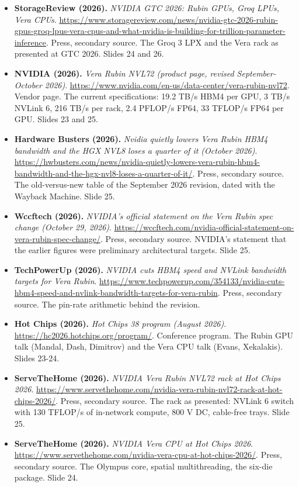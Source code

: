 \documentclass[11pt,letterpaper]{article}
\begin{document}
\begin{itemize}[leftmargin=1.2em,itemsep=3pt]
\item \textbf{StorageReview (2026).} \textit{NVIDIA GTC 2026: Rubin GPUs, Groq LPUs, Vera CPUs}. \url{https://www.storagereview.com/news/nvidia-gtc-2026-rubin-gpus-groq-lpus-vera-cpus-and-what-nvidia-is-building-for-trillion-parameter-inference}. Press, secondary source. The Groq 3 LPX and the Vera rack as presented at GTC 2026. Slides 24 and 26.
\item \textbf{NVIDIA (2026).} \textit{Vera Rubin NVL72 (product page, revised September-October 2026)}. \url{https://www.nvidia.com/en-us/data-center/vera-rubin-nvl72}. Vendor page. The current specifications: 19.2 TB/s HBM4 per GPU, 3 TB/s NVLink 6, 216 TB/s per rack, 2.4 PFLOP/s FP64, 33 TFLOP/s FP64 per GPU. Slides 23 and 25.
\item \textbf{Hardware Busters (2026).} \textit{Nvidia quietly lowers Vera Rubin HBM4 bandwidth and the HGX NVL8 loses a quarter of it (October 2026)}. \url{https://hwbusters.com/news/nvidia-quietly-lowers-vera-rubin-hbm4-bandwidth-and-the-hgx-nvl8-loses-a-quarter-of-it/}. Press, secondary source. The old-versus-new table of the September 2026 revision, dated with the Wayback Machine. Slide 25.
\item \textbf{Wccftech (2026).} \textit{NVIDIA's official statement on the Vera Rubin spec change (October 29, 2026)}. \url{https://wccftech.com/nvidia-official-statement-on-vera-rubin-spec-change/}. Press, secondary source. NVIDIA's statement that the earlier figures were preliminary architectural targets. Slide 25.
\item \textbf{TechPowerUp (2026).} \textit{NVIDIA cuts HBM4 speed and NVLink bandwidth targets for Vera Rubin}. \url{https://www.techpowerup.com/354133/nvidia-cuts-hbm4-speed-and-nvlink-bandwidth-targets-for-vera-rubin}. Press, secondary source. The pin-rate arithmetic behind the revision.
\item \textbf{Hot Chips (2026).} \textit{Hot Chips 38 program (August 2026)}. \url{https://hc2026.hotchips.org/program/}. Conference program. The Rubin GPU talk (Mandal, Dash, Dimitrov) and the Vera CPU talk (Evans, Xekalakis). Slides 23-24.
\item \textbf{ServeTheHome (2026).} \textit{NVIDIA Vera Rubin NVL72 rack at Hot Chips 2026}. \url{https://www.servethehome.com/nvidia-vera-rubin-nvl72-rack-at-hot-chips-2026/}. Press, secondary source. The rack as presented: NVLink 6 switch with 130 TFLOP/s of in-network compute, 800 V DC, cable-free trays. Slide 25.
\item \textbf{ServeTheHome (2026).} \textit{NVIDIA Vera CPU at Hot Chips 2026}. \url{https://www.servethehome.com/nvidia-vera-cpu-at-hot-chips-2026/}. Press, secondary source. The Olympus core, spatial multithreading, the six-die package. Slide 24.

\end{itemize}
\end{document}
